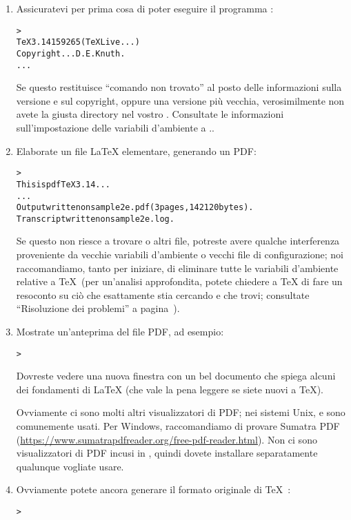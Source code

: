\documentclass{article}
\begin{document}
\begin{enumerate}

\item Assicuratevi per prima cosa di poter eseguire il programma
:
\begin{alltt}
> 
TeX 3.14159265 (TeX Live ...)
Copyright ... D.E. Knuth.
...
\end{alltt}
Se questo restituisce ``comando non trovato'' al posto delle informazioni
sulla versione e sul copyright, oppure una versione più vecchia,
verosimilmente non avete la giusta directory  nel vostro
. Consultate le informazioni sull'impostazione delle
variabili d'ambiente a \p.\pageref{sec:env}.

\item Elaborate un file \LaTeX{} elementare, generando un PDF:
\begin{alltt}
> 
This is pdfTeX 3.14...
...
Output written on sample2e.pdf (3 pages, 142120 bytes).
Transcript written on sample2e.log.
\end{alltt}
Se questo non riesce a trovare  o altri file,
potreste avere qualche interferenza proveniente da vecchie variabili
d'ambiente o vecchi file di configurazione; noi raccomandiamo, tanto per
iniziare, di eliminare tutte le variabili d'ambiente relative a \TeX\ (per
un'analisi approfondita, potete chiedere a \TeX{} di fare un resoconto su
ciò che esattamente stia cercando e che trovi; consultate ``Risoluzione
dei problemi'' a pagina~\pageref{sec:debugging}).

\item Mostrate un'anteprima del file PDF, ad esempio:
\begin{alltt}
> 
\end{alltt}
Dovreste vedere una nuova finestra con un bel documento che spiega alcuni
dei fondamenti di \LaTeX{} (che vale la pena leggere se siete nuovi a
\TeX).

Ovviamente ci sono molti altri visualizzatori di PDF; nei sistemi Unix,
 e  sono comunemente usati. Per Windows,
raccomandiamo di provare Sumatra PDF
(\url{https://www.sumatrapdfreader.org/free-pdf-reader.html}). Non ci
sono visualizzatori di PDF incusi in \TL, quindi dovete installare
separatamente qualunque vogliate usare.

\item Ovviamente potete ancora generare il formato originale di \TeX\ \dvi{}:
\begin{alltt}
> 
\end{alltt}


\end{enumerate}
\end{document}

